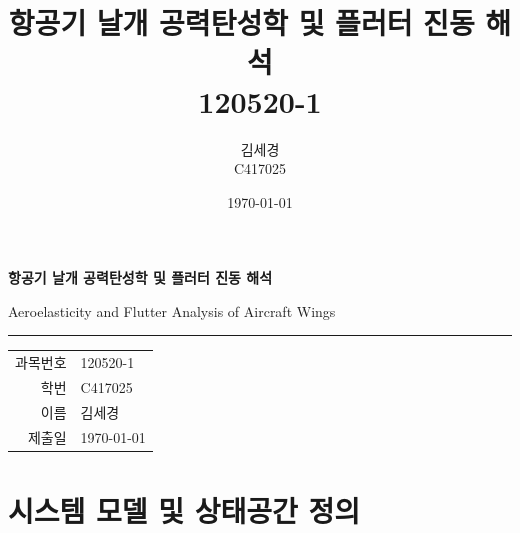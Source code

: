 \documentclass[
	a4paper, %
	10pt, %
]{CSUniSchoolLabReport}
\title{항공기 날개 공력탄성학 및 플러터 진동 해석\\
120520-1} %
\author{김세경\\C417025} %
\date{\today} %
\begin{document}
\begin{titlepage}
  \centering
  \vspace*{3cm}

  {\Large\bfseries 항공기 날개 공력탄성학 및 플러터 진동 해석\par}
  \vspace{0.6em}
  {\large Aeroelasticity and Flutter Analysis of Aircraft Wings\par}

  \vspace{1.5cm}
  \rule{0.6\textwidth}{0.4pt}
  \vspace{1.5cm}

  \begin{tabular}{rl}
    과목번호 & 120520-1 \\[6pt]
    학번     & C417025  \\[6pt]
    이름     & 김세경   \\[6pt]
    제출일   & \today   \\
  \end{tabular}

  \vfill
\end{titlepage}


\section{시스템 모델 및 상태공간 정의}
\end{document}
